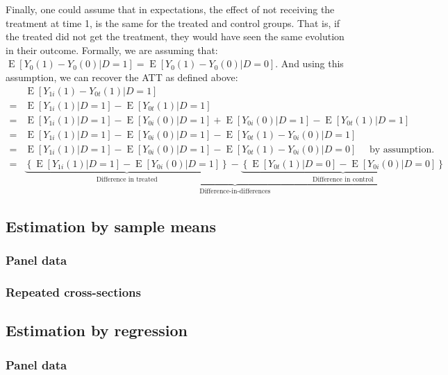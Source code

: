 \documentclass[12pt]{report}
\newcommand{\E}[1]{\operatorname{E}\left[#1\right]}
\begin{document}
Finally, one could assume that in expectations, the effect of not receiving the treatment at time 1, is the same for the treated and control groups. That is, if the treated did not get the treatment, they would have seen the same evolution in their outcome. Formally, we are assuming that: $\E{Y_0(1) - Y_0(0)\vert D=1} = \E{Y_0(1) - Y_0(0)\vert D=0}$. And using this assumption, we can recover the ATT as defined above: \begin{align*}
&\E{Y_{1i}(1) - Y_{0t}(1)\vert D=1} \\  = &\E{Y_{1i}(1)\vert D=1} - \E{Y_{0t}(1)\vert D=1} \\
 = &\E{Y_{1i}(1)\vert D=1} - \E{Y_{0i}(0)\vert D=1} + \E{Y_{0i}(0)\vert D=1} - \E{Y_{0t}(1)\vert D=1} \\
 = &\E{Y_{1i}(1)\vert D=1} - \E{Y_{0i}(0)\vert D=1} - \E{Y_{0t}(1) - Y_{0i}(0)\vert D=1} \\
 = &\E{Y_{1i}(1)\vert D=1} - \E{Y_{0i}(0)\vert D=1} - \E{Y_{0t}(1) - Y_{0i}(0)\vert D=0} \quad \text{ by assumption.}\\
 = &\underbrace{\underbrace{\left\lbrace\E{Y_{1i}(1)\vert D=1} - \E{Y_{0i}(0)\vert D=1}\right\rbrace}_{\text{Difference in treated}} - \underbrace{\left\lbrace\E{Y_{0t}(1)\vert D=0} - \E{Y_{0i}(0)\vert D=0}\right\rbrace}_{\text{Difference in control}}}_{\text{Difference-in-differences}}
\end{align*}

\subsection{Estimation by sample means}

\subsubsection{Panel data}



\subsubsection{Repeated cross-sections}



\subsection{Estimation by regression}

\subsubsection{Panel data}
\end{document}
